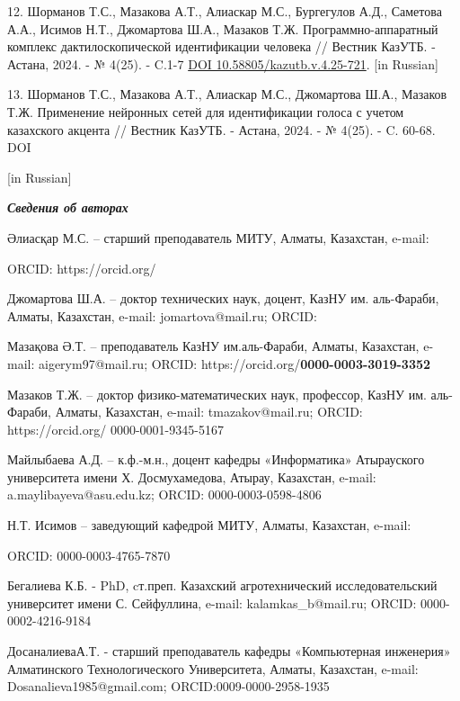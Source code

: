 \begin{references}
12. Шорманов Т.С., Мазакова А.Т., Алиаскар М.С., Бургегулов А.Д.,
Саметова А.А., Исимов Н.Т., Джомартова Ш.А., Мазаков Т.Ж.
Программно-аппаратный комплекс дактилоскопической идентификации человека
// Вестник КазУТБ. - Астана, 2024. - № 4(25). - C.1-7
\href{https://doi.org/10.58805/kazutb.v.4.25-721}{DOI
10.58805/kazutb.v.4.25-721}. {[}in Russian{]}

13. Шорманов Т.С., Мазакова А.Т., Алиаскар М.С., Джомартова Ш.А., Мазаков
Т.Ж. Применение нейронных сетей для идентификации голоса с учетом
казахского акцента // Вестник КазУТБ. - Астана, 2024. - № 4(25). - C.
60-68. DOI

{[}in Russian{]}
\end{references}

\begin{authorinfo}
\emph{{\bfseries Сведения об авторах}}

Әлиасқар М.С. -- старший преподаватель МИТУ, Алматы, Казахстан, e-mail:

ORCID:
https://orcid.org/\href{https://orcid.org/0000-0002-3013-6617}{}

Джомартова Ш.А. -- доктор технических наук, доцент, КазНУ им.
аль-Фараби, Алматы, Казахстан, e-mail:
jomartova@mail.ru; ORCID:
\href{https://orcid.org/0000-0002-5882-5588}{}

Мазақова Ә.Т. -- преподаватель КазНУ им.аль-Фараби, Алматы, Казахстан,
e-mail: aigerym97@mail.ru; ORCID:
https://orcid.org/{\bfseries 0000-0003-3019-3352}

Мазаков Т.Ж. -- доктор физико-математических наук, профессор, КазНУ им.
аль-Фараби, Алматы, Казахстан, e-mail:
tmazakov@mail.ru; ORCID:
https://orcid.org/ 0000-0001-9345-5167

Майлыбаева А.Д. -- к.ф.-м.н., доцент кафедры «Информатика» Атырауского
университета имени Х. Досмухамедова, Атырау, Казахстан, e-mail:
a.maylibayeva@asu.edu.kz;
ORCID: 0000-0003-0598-4806

Н.Т. Исимов -- заведующий кафедрой МИТУ, Алматы, Казахстан, e-mail:

ORCID: 0000-0003-4765-7870

Бегалиева К.Б. - PhD, cт.преп. Казахский агротехнический
исследовательский университет имени С. Сейфуллина, e-mail:
kalamkas\_b@mail.ru;
ORCID: 0000-0002-4216-9184

ДосаналиеваА.Т. - старший преподаватель кафедры «Компьютерная инженерия»
Алматинского Технологического Университета, Алматы, Казахстан, e-mail:
Dosanalieva1985@gmail.com;
ORCID:0009-0000-2958-1935


\end{authorinfo}

